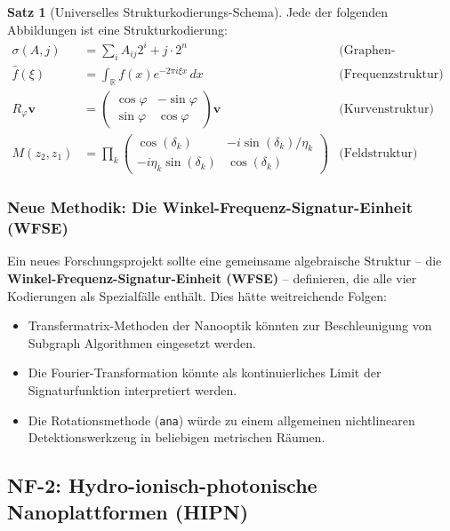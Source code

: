 ﻿\documentclass[a4paper,12pt]{scrreprt}
\theoremstyle{definition}
\newtheorem{satz}{Satz}[section]
\begin{document}
\begin{satz}[Universelles Strukturkodierungs-Schema]
  Jede der folgenden Abbildungen ist eine Strukturkodierung:
  \begin{align*}
    \sigma(A, j) &= \sum_i A_{ij} 2^i + j \cdot 2^n
      & \text{(Graphen-Fingerabdruck)} \\
    \hat{f}(\xi)  &= \int_{\mathbb{R}} f(x) e^{-2\pi i \xi x}\, dx
      & \text{(Frequenzstruktur)} \\
    R_\varphi \mathbf{v} &= \begin{pmatrix}\cos\varphi & -\sin\varphi \\ \sin\varphi & \cos\varphi\end{pmatrix} \mathbf{v}
      & \text{(Kurvenstruktur)} \\
    M(z_2, z_1) &= \prod_k \begin{pmatrix} \cos(\delta_k) & -i\sin(\delta_k)/\eta_k \\ -i\eta_k\sin(\delta_k) & \cos(\delta_k)\end{pmatrix}
      & \text{(Feldstruktur)}
  \end{align*}
\end{satz}

\subsubsection{Neue Methodik: Die Winkel-Frequenz-Signatur-Einheit (WFSE)}

Ein neues Forschungsprojekt sollte eine gemeinsame algebraische Struktur --
die \textbf{Winkel-Frequenz-Signatur-Einheit (WFSE)} -- definieren, die alle
vier Kodierungen als Spezialfälle enthält. Dies hätte weitreichende Folgen:

\begin{itemize}
  \item Transfermatrix-Methoden der Nanooptik könnten zur
    Beschleunigung von Subgraph Algorithmen eingesetzt werden.
  \item Die Fourier-Transformation könnte als kontinuierliches
    Limit der Signaturfunktion interpretiert werden.
  \item Die Rotationsmethode (\texttt{ana}) würde zu einem
    allgemeinen nichtlinearen Detektionswerkzeug in beliebigen
    metrischen Räumen.
\end{itemize}

\subsection{NF-2: Hydro-ionisch-photonische Nanoplattformen (HIPN)}
\end{document}
